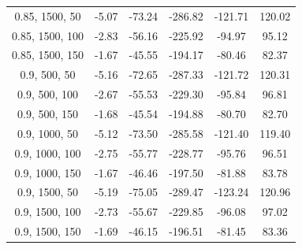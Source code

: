 \documentclass{article}
\begin{document}
\begin{table}[H]
{\begin{tabular}{|c|c|c|c|c|c|}
                0.85, 1500, 50             & -5.07                      & -73.24                     & -286.82                    & -121.71                  & 120.02                  \\
                0.85, 1500, 100            & -2.83                      & -56.16                     & -225.92                    & -94.97                   & 95.12                   \\
                0.85, 1500, 150            & -1.67                      & -45.55                     & -194.17                    & -80.46                   & 82.37                   \\
                0.9, 500, 50               & -5.16                      & -72.65                     & -287.33                    & -121.72                  & 120.31                  \\
                0.9, 500, 100              & -2.67                      & -55.53                     & -229.30                    & -95.84                   & 96.81                   \\
                0.9, 500, 150              & -1.68                      & -45.54                     & -194.88                    & -80.70                   & 82.70                   \\
                0.9, 1000, 50              & -5.12                      & -73.50                     & -285.58                    & -121.40                  & 119.40                  \\
                0.9, 1000, 100             & -2.75                      & -55.77                     & -228.77                    & -95.76                   & 96.51                   \\
                0.9, 1000, 150             & -1.67                      & -46.46                     & -197.50                    & -81.88                   & 83.78                   \\
                0.9, 1500, 50              & -5.19                      & -75.05                     & -289.47                    & -123.24                  & 120.96                  \\
                0.9, 1500, 100             & -2.73                      & -55.67                     & -229.85                    & -96.08                   & 97.02                   \\
                0.9, 1500, 150             & -1.69                      & -46.15                     & -196.51                    & -81.45                   & 83.36                   \\

\end{tabular}}
\end{table}
\end{document}
